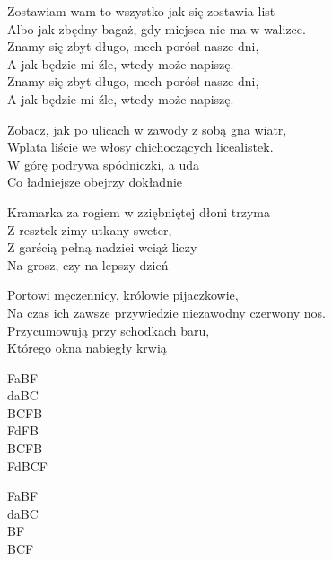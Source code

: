 \begin{text}
Zostawiam wam to wszystko jak się zostawia list\\
Albo jak zbędny bagaż, gdy miejsca nie ma w walizce.\\
Znamy się zbyt długo, mech porósł nasze dni,\\
A jak będzie mi źle, wtedy może napiszę.\\
Znamy się zbyt długo, mech porósł nasze dni,\\
A jak będzie mi źle, wtedy może napiszę.

Zobacz, jak po ulicach w zawody z sobą gna wiatr,\\
Wplata liście we włosy chichoczących licealistek.\\
W górę podrywa spódniczki, a uda\\
Co ładniejsze obejrzy dokładnie

Kramarka za rogiem w zziębniętej dłoni trzyma\\
Z resztek zimy utkany sweter,\\
Z garścią pełną nadziei wciąż liczy\\
Na grosz, czy na lepszy dzień

Portowi męczennicy, królowie pijaczkowie,\\
Na czas ich zawsze przywiedzie niezawodny czerwony nos.\\
Przycumowują przy schodkach baru,\\
Którego okna nabiegły krwią
\end{text}
\begin{chord}
    FaBF\\
    daBC\\
    BCFB\\
    FdFB\\
    BCFB\\
    FdBCF

    FaBF\\
    daBC\\
    BF\\
    BCF
\end{chord}